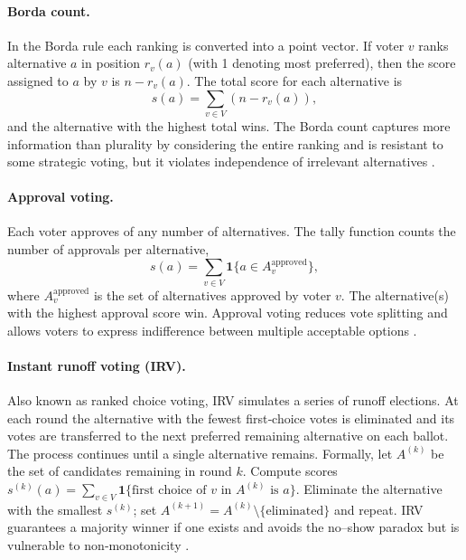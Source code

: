 \paragraph{Borda count.}  In the Borda rule each ranking is converted
into a point vector.  If voter $v$ ranks alternative $a$ in
position $r_{v}(a)$ (with 1 denoting most preferred), then the
score assigned to $a$ by $v$ is $n - r_{v}(a)$.  The total
score for each alternative is
\begin{equation}
    s(a) = \sum_{v \in V} (n - r_{v}(a)),
\end{equation}
and the alternative with the highest total wins.  The Borda count
captures more information than plurality by considering the entire
ranking and is resistant to some strategic voting, but it violates
independence of irrelevant alternatives \cite{Borda1784}.

\paragraph{Approval voting.}  Each voter approves of any number of
alternatives.  The tally function counts the number of approvals per
alternative,
\begin{equation}
    s(a) = \sum_{v \in V} \mathbf{1}\{a \in A_{v}^{\text{approved}}\},
\end{equation}
where $A_{v}^{\text{approved}}$ is the set of alternatives
approved by voter $v$.  The alternative(s) with the highest approval
score win.  Approval voting reduces vote splitting and allows voters
to express indifference between multiple acceptable options
\cite{Black1958}.

\paragraph{Instant runoff voting (IRV).}  Also known as ranked
choice voting, IRV simulates a series of runoff elections.  At each
round the alternative with the fewest first‑choice votes is eliminated
and its votes are transferred to the next preferred remaining
alternative on each ballot.  The process continues until a single
alternative remains.  Formally, let $A^{(k)}$ be the set of
candidates remaining in round $k$.  Compute scores
\(s^{(k)}(a) = \sum_{v \in V} \mathbf{1}\{\text{first choice of }v\text{ in }A^{(k)}\text{ is }a\}\).  Eliminate the alternative with the smallest
$s^{(k)}$; set $A^{(k+1)} = A^{(k)} \setminus \{\text{eliminated}\}$ and repeat.  IRV guarantees a majority winner if one exists and avoids
the no–show paradox but is vulnerable to non‑monotonicity
\cite{Bartholdi1989}.

